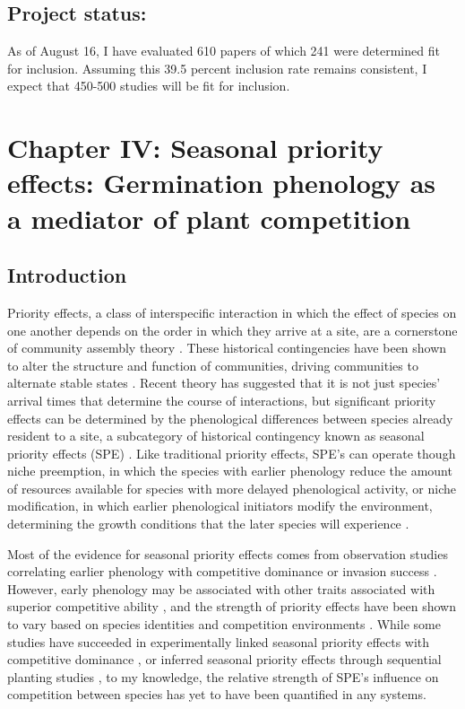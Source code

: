 \documentclass{article}\usepackage[]{graphicx}\usepackage[]{color}
\begin{document}
\subsection*{Project status:}
As of August 16, I have evaluated 610 papers of which 241 were determined fit for inclusion. Assuming this 39.5 percent inclusion rate remains consistent, I expect that 450-500 studies will be fit for inclusion.
\section*{Chapter IV: Seasonal priority effects: Germination phenology as a mediator of plant competition}
\subsection*{Introduction}
\indent\indent Priority effects, a class of interspecific interaction in which the effect of species on one another depends on the order in which they arrive at a site, are a cornerstone of community assembly theory \citep{Fukami2015}. These historical contingencies have been shown to alter the structure and function of communities, driving communities to alternate stable states \citep{Fukami2011}. Recent theory has suggested that it is not just species' arrival times that determine the course of interactions, but significant priority effects can be determined by the phenological differences between species already resident to a site, a subcategory of historical contingency known as seasonal priority effects (SPE) \citep{Wainwright2012}. Like traditional priority effects, SPE's can operate though niche preemption, in which the species with earlier phenology reduce the amount of resources available for species with more delayed phenological activity, or niche modification, in which earlier phenological initiators modify the environment, determining the growth conditions that the later species will experience \citep{Fukami2015}.
\par Most of the evidence for seasonal priority effects comes from observation studies correlating earlier phenology with competitive dominance or invasion success \citep{Gioria2018}. However, early phenology may be associated with other traits associated with superior competitive ability \citep{Dickson2012}, and the strength of priority effects have been shown to vary based on species identities \citep{Cleland2015} and competition environments \citep{Kardol2013}. While some studies have succeeded in experimentally linked seasonal priority effects with competitive dominance \citep{Wainwright2012}, or inferred seasonal priority effects through sequential planting studies \citep{Korner2008}, to my knowledge, the relative strength of SPE's influence on competition between species has yet to have been quantified in any systems.\\
\end{document}
